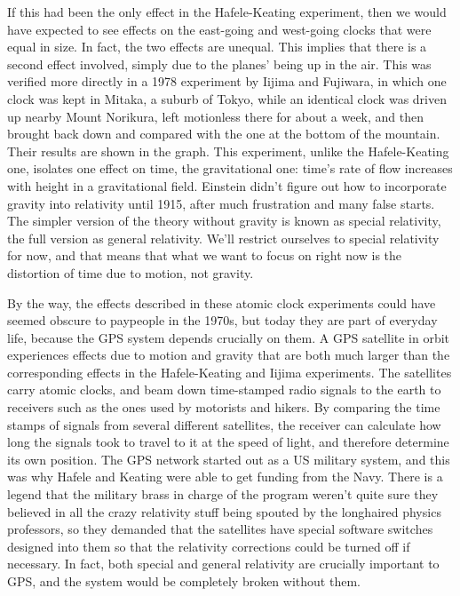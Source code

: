 If this had been the only effect in the Hafele-Keating experiment, then we would have expected to see effects on the
east-going and west-going clocks that were equal in size.
In fact, the two effects are unequal. This
implies that there is a second effect involved, simply due to the planes' being up in the air.
This was verified more directly in a 1978 experiment by Iijima and Fujiwara, in which one clock was
kept in Mitaka, a suburb of Tokyo, while an identical clock was driven up nearby Mount Norikura,
left motionless there for about a week, and then brought back down and compared with the one at the bottom of the mountain.
Their results are shown in the graph.
This experiment, unlike the Hafele-Keating one, isolates one effect on time, the gravitational one: time's
rate of flow increases with height in a gravitational field. Einstein didn't figure out
how to incorporate gravity into relativity until 1915, after much frustration and many false starts. The
simpler version of the theory without gravity is known as special relativity, the full version as general
relativity. We'll restrict ourselves to special relativity for now, and that means that what we want to
focus on right now is the distortion of time due to motion, not gravity.


By the way, the effects described in these atomic clock experiments could have seemed obscure
to paypeople in the 1970s, but today they are part of everyday life, because the GPS system depends
crucially on them. A GPS satellite in orbit experiences effects due to motion and gravity that are both
much larger than the corresponding effects in the Hafele-Keating and Iijima experiments. The satellites carry
atomic clocks, and beam down time-stamped
radio signals to the earth to  receivers such as the ones used by motorists and hikers.
By comparing the time stamps of signals from several different satellites, the receiver can calculate
how long the signals took to travel to it at the speed of light, and therefore determine its own position.
The GPS network started out as a US military system, and this was why Hafele and Keating were able to get
funding from the Navy. There is a legend that the military brass in charge of the program weren't quite sure
they believed in all the crazy relativity stuff being spouted by the longhaired physics professors, so they
demanded that the satellites have special software switches designed into them so that the relativity corrections
could be turned off if necessary. In fact, both special and general relativity are crucially important to GPS,
and the system would be completely broken without them.

